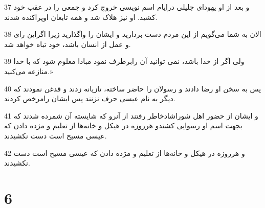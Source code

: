 \par 37 و بعد از او یهودای جلیلی درایام اسم نویسی خروج کرد و جمعی را در عقب خود کشید. او نیز هلاک شد و همه تابعان اوپراکنده شدند.
\par 38 الان به شما می‌گویم از این مردم دست بردارید و ایشان را واگذارید زیرا اگراین رای و عمل از انسان باشد، خود تباه خواهد شد.
\par 39 ولی اگر از خدا باشد، نمی توانید آن رابرطرف نمود مبادا معلوم شود که با خدا منازعه می‌کنید.»
\par 40 پس به سخن او رضا دادند و رسولان را حاضر ساخته، تازیانه زدند و قدغن نمودند که دیگر به نام عیسی حرف نزنند پس ایشان رامرخص کردند.
\par 41 و ایشان از حضور اهل شوراشادخاطر رفتند از آنرو که شایسته آن شمرده شدند که بجهت اسم او رسوایی کشندو هرروزه در هیکل و خانه‌ها از تعلیم و مژده دادن که عیسی مسیح است دست نکشیدند.
\par 42 و هرروزه در هیکل و خانه‌ها از تعلیم و مژده دادن که عیسی مسیح است دست نکشیدند.

\chapter{6}

